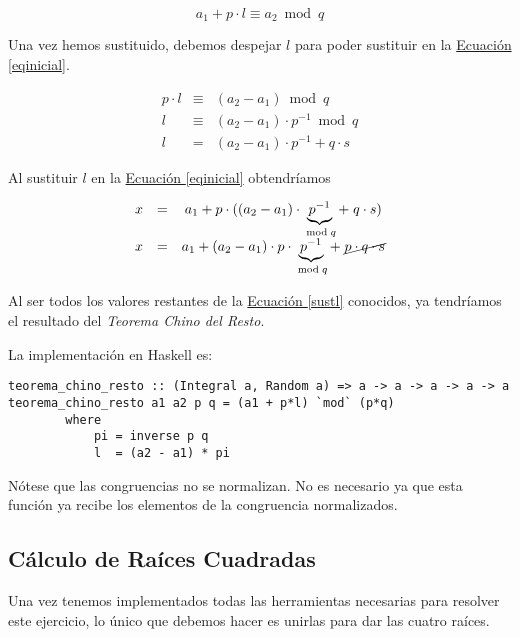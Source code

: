 \documentclass[10pt,spanish]{article}
\begin{document}
\begin{equation}
\label{eqsusx}
    a_1 + p \cdot l \equiv a_2 \bmod q
\end{equation}


Una vez hemos sustituido, debemos despejar $l$ para poder sustituir en la \hyperref[eqinicial]{Ecuación \ref*{eqinicial}}.

\begin{equation}
\label{eqpdesl}
\begin{matrix}
p \cdot l & \equiv & (a_2 - a_1) \bmod q \\
l & \equiv & (a_2 - a_1) \cdot p^{-1} \bmod q\\
l & = & (a_2 - a_1) \cdot p^{-1} + q \cdot s
\end{matrix}     
\end{equation}

Al sustituir $l$ en la \hyperref[eqinicial]{Ecuación \ref*{eqinicial}} obtendríamos

\begin{equation}
\label{sustl}
\begin{matrix}
x & = & a_1 + p \cdot ((a_2 - a_1) \cdot \underbrace{p^{-1}}_{\bmod q} +\; q \cdot s)\\
x & = & a_1 + (a_2 - a_1) \cdot p \cdot \underbrace{p^{-1}}_{\bmod q} +\; \cancel{p \cdot q \cdot s}
\end{matrix}
\end{equation}

Al ser todos los valores restantes de la \hyperref[sustl]{Ecuación \ref*{sustl}} conocidos, ya tendríamos el resultado del \textcolor{rojo}{\textit{Teorema Chino del Resto}}.

La implementación en Haskell es:

\begin{verbatim}
teorema_chino_resto :: (Integral a, Random a) => a -> a -> a -> a -> a
teorema_chino_resto a1 a2 p q = (a1 + p*l) `mod` (p*q)
        where
            pi = inverse p q
            l  = (a2 - a1) * pi
\end{verbatim}

Nótese que las congruencias no se normalizan. No es necesario ya que esta función ya recibe los elementos de la congruencia normalizados.

\subsection{\textcolor{rojo}Cálculo de Raíces Cuadradas}
Una vez tenemos implementados todas las herramientas necesarias para resolver este ejercicio, lo único que debemos hacer es unirlas para dar las cuatro raíces.
\end{document}
